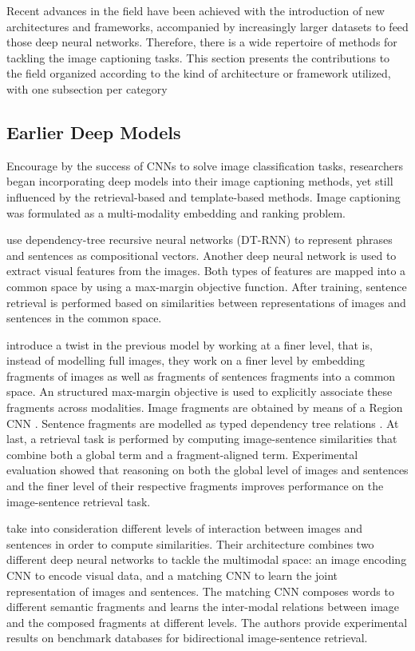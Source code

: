 Recent advances in the field have been achieved with the introduction of new architectures and frameworks, accompanied by increasingly larger datasets to feed those deep neural networks. Therefore, there is a wide repertoire of methods for tackling the image captioning tasks. This section presents the contributions to the field organized according to the kind of architecture or framework utilized, with one subsection per category

\subsection{Earlier Deep Models}\label{sec:earlier_deep-models}

Encourage by the success of CNNs to solve image classification tasks, researchers began incorporating deep models into their image captioning methods, yet still influenced by the retrieval-based and template-based methods. Image captioning was formulated as a multi-modality embedding \citet{Frome2013} and ranking problem.

\citet{Socher2014} use dependency-tree recursive neural networks (DT-RNN) to represent phrases and sentences as compositional vectors. Another deep neural network \citep{Le2013} is used to extract visual features from the images. Both types of  features are mapped into a common space by using a max-margin objective function. After training, sentence retrieval is performed based on similarities between representations of images and sentences in the common space.

\citet{Karpathy2014} introduce a twist in the previous model by working at a finer level, that is, instead of modelling full images, they work on a finer level by embedding fragments of images as well as fragments of sentences fragments into a common space.  An structured max-margin objective is used to explicitly associate these fragments across modalities. Image fragments are obtained by means of a Region CNN \citep{Girshick2014}. Sentence fragments are modelled as typed dependency tree relations \citep{DeMarneffe2006}. At last, a retrieval task is performed by computing image-sentence similarities that combine both a global term and a fragment-aligned term. Experimental evaluation showed that reasoning on both the global level of images and sentences and the finer level of their respective fragments improves performance on the image-sentence retrieval task.

\citet{Ma2015} take into consideration different levels of interaction between images and sentences in order to compute similarities. Their architecture combines two different deep neural networks to tackle the multimodal space: an image encoding CNN \citep{Simonyan2015} to encode visual data, and a matching CNN \citep{Hu2014} to learn the joint representation of images and sentences. The matching CNN composes words to different semantic fragments and learns the inter-modal relations between image and the composed fragments at different levels. The authors provide experimental results on benchmark databases for bidirectional image-sentence retrieval.

